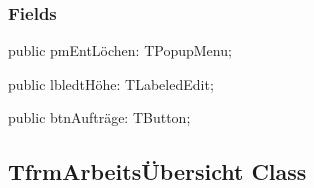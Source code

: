\documentclass{report}
\newif\ifpdf
\begin{document}
\subsubsection*{\large{\textbf{Fields}}\normalsize\hspace{1ex}\hfill}
\begin{list}{}{
\setlength{\itemindent}{0cm}
\setlength{\listparindent}{0cm}
\setlength{\leftmargin}{\evensidemargin}
\addtolength{\leftmargin}{\tmplength}
\settowidth{\labelsep}{X}
\addtolength{\leftmargin}{\labelsep}
\setlength{\labelwidth}{\tmplength}
}
\label{ok_unicode_identifiers_utf8.TMyClass-pmEntLöchen}
\item[\textbf{pmEntLöchen}\hfill]
\ifpdf
\begin{flushleft}
\fi
\begin{ttfamily}
public pmEntLöchen: TPopupMenu;\end{ttfamily}

\ifpdf
\end{flushleft}
\fi


\par  \label{ok_unicode_identifiers_utf8.TMyClass-lbledtHöhe}
\item[\textbf{lbledtHöhe}\hfill]
\ifpdf
\begin{flushleft}
\fi
\begin{ttfamily}
public lbledtHöhe: TLabeledEdit;\end{ttfamily}

\ifpdf
\end{flushleft}
\fi


\par  \label{ok_unicode_identifiers_utf8.TMyClass-btnAufträge}
\item[\textbf{btnAufträge}\hfill]
\ifpdf
\begin{flushleft}
\fi
\begin{ttfamily}
public btnAufträge: TButton;\end{ttfamily}

\ifpdf
\end{flushleft}
\fi


\par  \end{list}
\ifpdf
\subsection*{\large{\textbf{TfrmArbeitsÜbersicht Class}}\normalsize\hspace{1ex}\hrulefill}
\else
\end{document}
